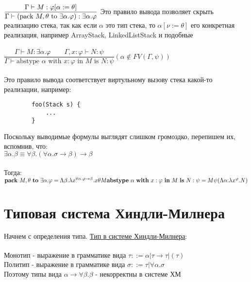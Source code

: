 	
 	$\dfrac{\Gamma \vdash M : \varphi[\alpha := \theta]}{\Gamma\vdash (\text{pack } M, \theta \text{ to } \exists \alpha . \varphi) : \exists \alpha.\varphi}\\ \\ \\
 	 $ Это правило вывода позволяет скрыть реализацию стека, так как если $\alpha$ это тип стека, то $\alpha[\nu := \theta]$ его конкретная реализация, например ArrayStack, LinkedListStack и подобные \\ \\
 	 $
 	\dfrac{\Gamma \vdash M : \exists \alpha . \varphi\qquad\Gamma, x : \varphi \vdash N : \psi}{\Gamma \vdash \text{abstype } \alpha \text{ with } x:\varphi \text{ in } M \text{ is } N:\psi}
	(\alpha \notin FV(\Gamma, \psi))$
	\\ \\
	Это правило вывода соответствует виртульному вызову стека какой-то реализации, например: 
	\begin{verbatim}
		foo(Stack s) {
			...
		}
	\end{verbatim}
	Поскольку выводимые формулы выглядят слишком громоздко, перепишем их, вспомнив, что: \\
	$\exists\alpha.\beta\equiv\forall\beta.(\forall\alpha.\sigma\rightarrow\beta)\rightarrow\beta$\\\\
	Тогда: \\
	$	\text{\textbf{pack} } M, \theta \text{ \textbf{to} } \exists \alpha . \varphi =
		\Lambda \beta . \lambda x^{\forall \alpha . \varphi \to \beta} . x \theta M \\
		\text{\textbf{abstype} } \alpha \text{ \textbf{with} } x:\varphi \text{ \textbf{in} } M \text{ \textbf{is} } N:\psi =
		M \psi (\Lambda \alpha . \lambda x ^ \varphi . N)
	$
	
	 \section{Типовая система Хиндли-Милнера}
	   
	 Начнем с определения типа. \underline{Тип в системе Хиндли-Милнера}: \\ \\
	 Монотип - выражение в грамматике вида $\tau::=\alpha|\tau\rightarrow\tau|(\tau)$\\
	 Политип - выражение в грамматике вида $\sigma::=\tau|\forall\alpha.\sigma$\\
	 
	 \noindent Поэтому типы вида $\alpha\rightarrow\forall\beta.\beta$ - некорректны в системе ХМ\\
	 
